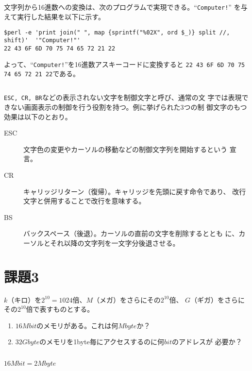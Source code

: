\documentclass[a4j,9pt]{jsarticle}
\begin{document}
\subsection{}
文字列から16進数への変換は、次のプログラムで実現できる。``\texttt{Computer!}''
を与えて実行した結果を以下に示す。

\begin{lstlisting}
$perl -e 'print join(" ", map {sprintf("%02X", ord $_)} split //, shift)'  '"Computer!"'
22 43 6F 6D 70 75 74 65 72 21 22
\end{lstlisting}
よって、``\texttt{Computer!}''を16進数アスキーコードに変換すると
\texttt{22 43 6F 6D 70 75 74 65 72 21 22}である。

\subsection{}
\texttt{ESC, CR, BR}などの表示されない文字を制御文字と呼び、通常の文
字では表現できない画面表示の制御を行う役割を持つ。例に挙げられた3つの制
御文字のもつ効果は以下のとおり。

\begin{description}
 \item[ESC] 文字色の変更やカーソルの移動などの制御文字列を開始するという
            宣言。
 \item[CR] キャリッジリターン（復帰）。キャリッジを先頭に戻す命令であり、
            改行文字と併用することで改行を意味する。
 \item[BS] バックスペース（後退）。カーソルの直前の文字を削除するととも
            に、カーソルとそれ以降の文字列を一文字分後退させる。
\end{description}

\section{課題3}
\begin{screen}
 $k$（キロ）を$2^{10}=1024$倍、$M$（メガ）をさらにその$2^{10}$倍、
 $G$（ギガ）をさらにその$2^{10}$倍で表すものとする。
 \begin{enumerate}
  \item $16Mbit$のメモリがある。これは何$Mbyte$か？
  \item $32Gbyte$のメモリを1byte毎にアクセスするのに何$bit$のアドレスが
        必要か？
\end{enumerate}
\end{screen}

\subsection{}
$16Mbit = 2Mbyte$
\end{document}
